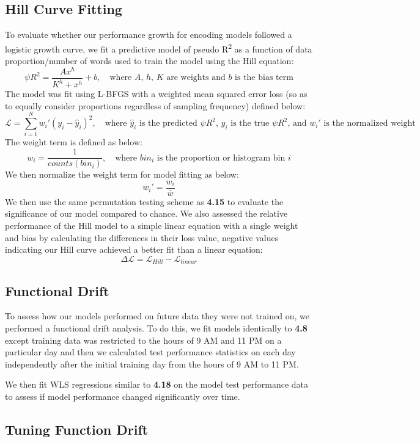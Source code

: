 \documentclass[pdflatex,sn-basic]{sn-jnl}%
\theoremstyle{thmstyleone}%
\theoremstyle{thmstyletwo}%
\theoremstyle{thmstylethree}%
\begin{document}
\subsection{Hill Curve Fitting}\label{subsec23}
To evaluate whether our performance growth for encoding models followed a logistic growth curve, we fit a predictive model of pseudo R\textsuperscript{2} as a function of data proportion/number of words used to train the model using the Hill equation:
\[
\psi R^2=\frac{Ax^h}{K^h+x^h}+b, \quad \text{where $A$, $h$, $K$ are weights and $b$ is the bias term}
\]
The model was fit using L-BFGS with a weighted mean squared error loss (so as to equally consider proportions  regardless of sampling frequency) defined below:
\[
\mathcal{L}=\sum_{i=1}^Nw_i'(y_i-\hat{y}_i)^2, \quad \text{where $\hat{y}_i$ is the predicted $\psi R^2$, $y_i$ is the true $\psi R^2$, and $w_i'$ is the normalized weight}
\]
The weight term is defined as below:
\[
w_i=\frac{1}{\mathit{counts}(\mathit{bin}_i)}, \quad \text{where $\mathit{bin}_i$ is the proportion or histogram bin $i$}
\]
We then normalize the weight term for model fitting as below:
\[
w_i'=\frac{w_i}{\bar{w}}
\]
We then use the same permutation testing scheme as \textbf{4.15} to evaluate the significance of our model compared to chance. We also assessed the relative performance of the Hill model to a simple linear equation with a single weight and bias by calculating the differences in their loss value, negative values indicating our Hill curve achieved a better fit than a linear equation:
\[
\Delta\mathcal{L}=\mathcal{L}_\mathit{Hill}-\mathcal{L}_\mathit{linear}
\]

\subsection{Functional Drift}\label{subsec24}
To assess how our models performed on future data they were not trained on, we performed a functional drift analysis. To do this, we fit models identically to \textbf{4.8} except training data was restricted to the hours of 9 AM and 11 PM on a particular day and then we calculated test performance statistics on each day independently after the initial training day from the hours of 9 AM to 11 PM.

We then fit WLS regressions similar to \textbf{4.18} on the model test performance data to assess if model performance changed significantly over time.

\subsection{Tuning Function Drift}\label{subsec25}
\end{document}
